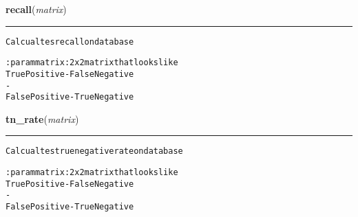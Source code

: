     \label{hal:ml:utils:matrix:recall}

    \vspace{0.5ex}

\hspace{.8\funcindent}\begin{boxedminipage}{\funcwidth}

    \raggedright \textbf{recall}(\textit{matrix})

    \vspace{-1.5ex}

    \rule{\textwidth}{0.5\fboxrule}
\setlength{\parskip}{2ex}
\begin{alltt}
Calcualtes recall on database

:param matrix: 2x2 matrix that looks like
True Positive  - False Negative
     {\textbar}         -       {\textbar}
False Positive - True Negative
\end{alltt}

\setlength{\parskip}{1ex}
    \end{boxedminipage}

    \label{hal:ml:utils:matrix:tn_rate}

    \vspace{0.5ex}

\hspace{.8\funcindent}\begin{boxedminipage}{\funcwidth}

    \raggedright \textbf{tn\_rate}(\textit{matrix})

    \vspace{-1.5ex}

    \rule{\textwidth}{0.5\fboxrule}
\setlength{\parskip}{2ex}
\begin{alltt}
Calcualtes true negative rate on database

:param matrix: 2x2 matrix that looks like
True Positive  - False Negative
     {\textbar}         -       {\textbar}
False Positive - True Negative
\end{alltt}

\setlength{\parskip}{1ex}
    \end{boxedminipage}

    \label{hal:ml:utils:matrix:accuracy}

